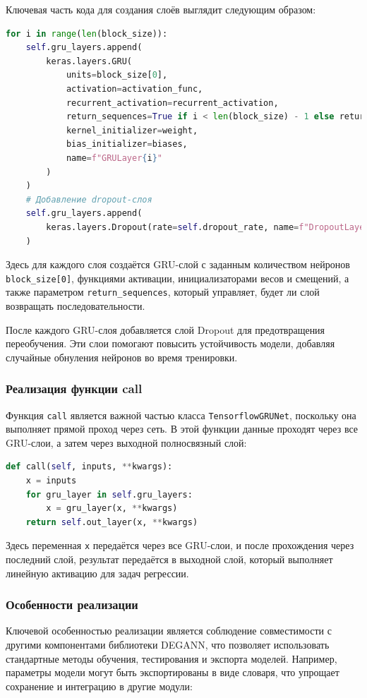 Ключевая часть кода для создания слоёв выглядит следующим образом:

\begin{lstlisting}[language=Python, breaklines, caption=Инициализация GRU-слоёв]
for i in range(len(block_size)):
    self.gru_layers.append(
        keras.layers.GRU(
            units=block_size[0],
            activation=activation_func,
            recurrent_activation=recurrent_activation,
            return_sequences=True if i < len(block_size) - 1 else return_sequences,
            kernel_initializer=weight,
            bias_initializer=biases,
            name=f"GRULayer{i}"
        )
    )
    # Добавление dropout-слоя
    self.gru_layers.append(
        keras.layers.Dropout(rate=self.dropout_rate, name=f"DropoutLayer{i}")
    )
\end{lstlisting}

Здесь для каждого слоя создаётся GRU-слой с заданным количеством нейронов \texttt{block\_size[0]}, функциями активации, инициализаторами весов и смещений, а также параметром \texttt{return\_sequences}, который управляет, будет ли слой возвращать последовательности.

После каждого GRU-слоя добавляется слой Dropout для предотвращения переобучения. Эти слои помогают повысить устойчивость модели, добавляя случайные обнуления нейронов во время тренировки.

\subsubsection{Реализация функции call}
Функция \texttt{call} является важной частью класса \texttt{TensorflowGRUNet}, поскольку она выполняет прямой проход через сеть. В этой функции данные проходят через все GRU-слои, а затем через выходной полносвязный слой:

\begin{lstlisting}[language=Python, caption=Функция call]
def call(self, inputs, **kwargs):
    x = inputs
    for gru_layer in self.gru_layers:
        x = gru_layer(x, **kwargs)
    return self.out_layer(x, **kwargs)
\end{lstlisting}

Здесь переменная \texttt{x} передаётся через все GRU-слои, и после прохождения через последний слой, результат передаётся в выходной слой, который выполняет линейную активацию для задач регрессии.

\subsubsection{Особенности реализации}
Ключевой особенностью реализации является соблюдение совместимости с другими компонентами библиотеки DEGANN, что позволяет использовать стандартные методы обучения, тестирования и экспорта моделей. Например, параметры модели могут быть экспортированы в виде словаря, что упрощает сохранение и интеграцию в другие модули:

